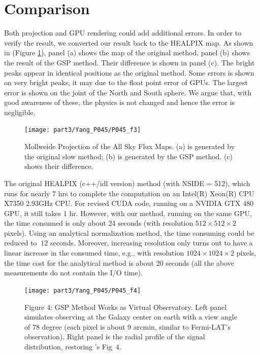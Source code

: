 \section{Comparison}
Both projection and GPU rendering could add additional errors. In order to verify the result, we converted our result back to the HEALPIX map. As shown in (Figure \ref{figcmp}), panel (a) shows the map of the original method, panel (b) shows the result of the GSP method. Their difference is shown in panel (c). The bright peaks appear in identical positions as the original method. Some errors is shown on very bright peaks, it may due to the float point error of GPUs. The largest error is shown on the joint of the North and South sphere. We argue that, with good awareness of these, the physics is not changed and hence the error is negligible. 

\begin{figure}[htb]
\begin{center}
 \texttt{[image: part3/Yang\_P045/P045\_f3]}
\caption{Mollweide Projection of the All Sky Flux Maps. (a) is generated by the original slow method; (b) is generated by the GSP method. (c) shows their difference. \label{figcmp}}
\end{center}
\end{figure}

The original HEALPIX (c++/idl version) method (with NSIDE = 512), which runs for nearly 7 hrs to complete the computation on an Intel(R) Xeon(R) CPU X7350 2.93GHz CPU. For revised CUDA code, running on a NVIDIA GTX 480 GPU, it still takes 1 hr. However, with our method, running on the same GPU, the time consumed is only about 24 seconds (with resolution $512\times512\times2$ pixels). Using an analytical normalization method, the time consuming could be reduced to $~12$ seconds. Moreover, increasing resolution only turns out to have a linear increase in the consumed time, e.g., with resolution $1024\times1024\times2$ pixels, the time cost for the analytical method is about 20 seconds (all the above measurements do not contain the I/O time). 

\begin{figure}[htb]
\begin{center}
 \texttt{[image: part3/Yang\_P045/P045\_f4]}
\caption{Figure 4: GSP Method Works as Virtual Observatory. Left panel simulates observing at the Galaxy center on earth with a view angle of 78 degree (each pixel is about 9 arcmin, similar to Fermi-LAT’s observation). Right panel is the radial profile of the signal distribution, restoring \citet{Kuhlen:2008kr}'s Fig~4.  \label{figapp}}
\end{center}
\end{figure}

